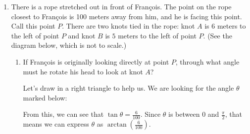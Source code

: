 \documentclass{article}
\begin{document}
\begin{enumerate}
\begin{enumerate}[resume]
  \end{enumerate}
  \probonly{\newpage}

\item
  \label{francois-rope-optimization} %

  There is a rope stretched out in front of Fran\c{c}ois.  The point on
  the rope closest to Fran\c{c}ois is 100 meters away from him, and he is
  facing this point.  Call this point $P$.  There are two knots tied in
  the rope: knot $A$ is 6 meters to the left of point $P$ and knot $B$ is
  $5$ meters to the left of point $P$.  (See the diagram below, which is
  not to scale.)
  \begin{center}
  \end{center}

  \begin{enumerate}
  \item \label{francois-rope-optimization-prep}
    \begin{problem}[\vfill]
      If Fran\c{c}ois is originally looking directly at point $P$, through
      what angle must he rotate his head to look at knot $A$?
    \end{problem}

    \begin{solution}
      Let's draw in a right triangle to help us.  We are looking for the
      angle $\theta$ marked below:
      \begin{center}
      \end{center}
      From this, we can see that $\tan \theta = \frac{6}{100}$.  Since
      $\theta$ is between $0$ and $\frac{\pi}{2}$, that means we can
      express $\theta$ as $\boxed{\arctan \left( \frac{6}{100} \right)}$. 
    \end{solution}


\end{enumerate}
\end{enumerate}
\end{document}
